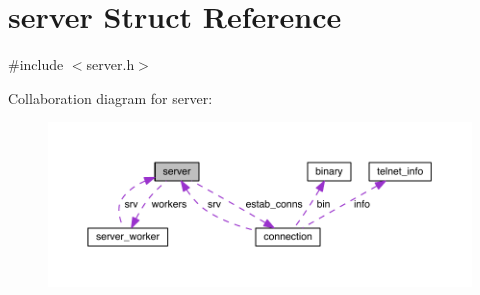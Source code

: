 \hypertarget{structserver}{}\section{server Struct Reference}
\label{structserver}


{\ttfamily \#include $<$server.\+h$>$}



Collaboration diagram for server\+:
\nopagebreak
\begin{figure}[H]
\begin{center}
\leavevmode
\includegraphics[width=350pt]{structserver__coll__graph}
\end{center}
\end{figure}
